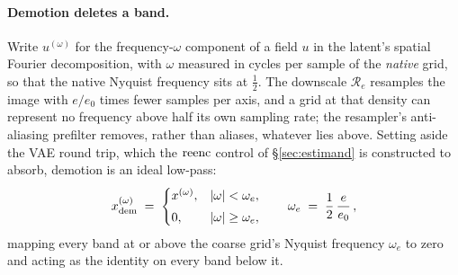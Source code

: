 \paragraph{Demotion deletes a band.}
Write $u^{(\omega)}$ for the frequency-$\omega$ component of a field
$u$ in the latent's spatial Fourier decomposition, with $\omega$
measured in cycles per sample of the \emph{native} grid, so that the
native Nyquist frequency sits at $\tfrac12$. The downscale
$\mathcal{R}_e$ resamples the image with $e/e_0$ times fewer samples
per axis, and a grid at that density can represent no frequency above
half its own sampling rate; the resampler's anti-aliasing prefilter
removes, rather than aliases, whatever lies above. Setting aside the
VAE round trip, which the $\mathrm{reenc}$ control of \S\ref{sec:estimand} is
constructed to absorb, demotion is an ideal low-pass:
\begin{equation}
x_{\mathrm{dem}}^{(\omega)} \;=\;
\begin{cases}
x^{(\omega)}, & |\omega| < \omega_e,\\[3pt]
0, & |\omega| \ge \omega_e,
\end{cases}
\qquad
\omega_e \;=\; \frac{1}{2}\,\frac{e}{e_0}\,,
\label{eq:lowpass}
\end{equation}
mapping every band at or above the coarse grid's Nyquist frequency
$\omega_e$ to zero and acting as the identity on every band below it.

